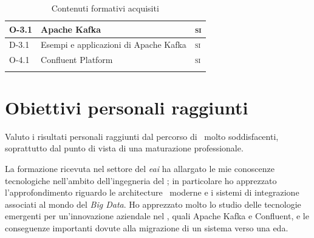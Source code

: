 \begin{small}
\begin{center}
\begin{longtable}{| >{\centering\arraybackslash}m{2cm}|m{9.5cm}|>{\centering\arraybackslash}m{2.2cm}|}
    O-3.1 & Apache Kafka
        & \textsc{si}\\
    \hline
    D-3.1 & Esempi e applicazioni di Apache Kafka & \textsc{si} \\
    \Xhline{2\arrayrulewidth}

    O-4.1 & Confluent Platform
       & \textsc{si}\\
    \Xhline{2\arrayrulewidth}


      \caption{Contenuti formativi acquisiti}
    \end{longtable}
  \end{center}
\end{small}

\section{Obiettivi personali raggiunti}
%
%
%
%
%
Valuto i risultati personali raggiunti dal percorso di \stage\ molto soddisfacenti, soprattutto dal punto di vista di una maturazione professionale.

La formazione ricevuta nel settore del \textit{\acrlong{eai}} ha allargato le mie conoscenze tecnologiche nell'ambito dell'ingegneria del \software; in particolare ho apprezzato l'approfondimento riguardo le architecture \software\ moderne e i sistemi di integrazione associati al mondo del \textit{Big Data}.
Ho apprezzato molto lo studio delle tecnologie emergenti per un'innovazione aziendale nel , quali Apache Kafka e Confluent, e le conseguenze importanti dovute alla migrazione di un sistema verso una \acrlong{eda}.

